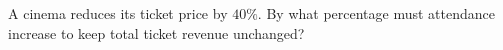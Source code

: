 A cinema reduces its ticket price by $40\%$. By what percentage must attendance increase to keep total ticket revenue unchanged?
